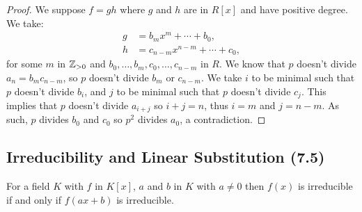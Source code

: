 \begin{proof}
    We suppose $f = gh$ where $g$ and $h$ are in $R[x]$ and have positive degree. We take:
    \begin{align*}
        g &= b_mx^m + \cdots + b_0, \\
        h &= c_{n - m}x^{n - m} + \cdots + c_0,
    \end{align*} for some $m$ in $\mathbb{Z}_{> 0}$ and $b_0, \ldots, b_m, c_0, \ldots, c_{n - m}$
    in $R$. We know that $p$ doesn't divide $a_n = b_mc_{n - m}$, so $p$ doesn't divide
    $b_m$ or $c_{n - m}$. We take $i$ to be minimal such that $p$ doesn't divide $b_i$,
    and $j$ to be minimal such that $p$ doesn't divide $c_j$. This implies that $p$ doesn't
    divide $a_{i + j}$ so $i + j = n$, thus $i = m$ and $j = n - m$. As such,
    $p$ divides $b_0$ and $c_0$ so $p^2$ divides $a_0$, a contradiction.
\end{proof}

\subsection{Irreducibility and Linear Substitution (7.5)} \label{7.5}

For a field $K$ with $f$ in $K[x]$, $a$ and $b$ in $K$ with $a \neq 0$ then
$f(x)$ is irreducible if and only if $f(ax + b)$ is irreducible. 

